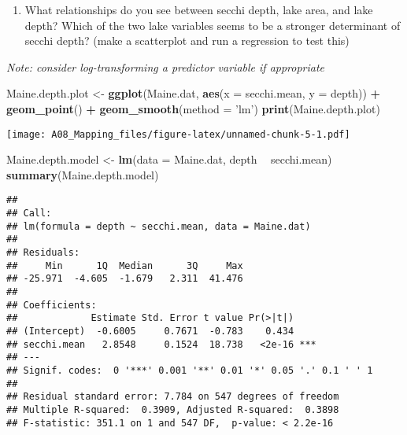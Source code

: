 \documentclass[]{article}
\newenvironment{Shaded}{\begin{snugshade}}{\end{snugshade}}
\newcommand{\DataTypeTok}[1]{\textcolor[rgb]{0.13,0.29,0.53}{#1}}
\newcommand{\KeywordTok}[1]{\textcolor[rgb]{0.13,0.29,0.53}{\textbf{#1}}}
\newcommand{\NormalTok}[1]{#1}
\newcommand{\OperatorTok}[1]{\textcolor[rgb]{0.81,0.36,0.00}{\textbf{#1}}}
\newcommand{\StringTok}[1]{\textcolor[rgb]{0.31,0.60,0.02}{#1}}
\providecommand{\tightlist}{%
  \setlength{\itemsep}{0pt}\setlength{\parskip}{0pt}}
\begin{document}
\begin{enumerate}
\def\labelenumi{\arabic{enumi}.}
\setcounter{enumi}{8}
\tightlist
\item
  What relationships do you see between secchi depth, lake area, and
  lake depth? Which of the two lake variables seems to be a stronger
  determinant of secchi depth? (make a scatterplot and run a regression
  to test this)
\end{enumerate}

\emph{Note: consider log-transforming a predictor variable if
appropriate}

\begin{Shaded}
\begin{Highlighting}[]
\NormalTok{Maine.depth.plot <-}\StringTok{ }\KeywordTok{ggplot}\NormalTok{(Maine.dat, }\KeywordTok{aes}\NormalTok{(}\DataTypeTok{x =}\NormalTok{ secchi.mean, }\DataTypeTok{y =}\NormalTok{ depth)) }\OperatorTok{+}
\StringTok{  }\KeywordTok{geom_point}\NormalTok{() }\OperatorTok{+}
\StringTok{  }\KeywordTok{geom_smooth}\NormalTok{(}\DataTypeTok{method =} \StringTok{'lm'}\NormalTok{)}
\KeywordTok{print}\NormalTok{(Maine.depth.plot)}
\end{Highlighting}
\end{Shaded}

\texttt{[image: A08\_Mapping\_files/figure-latex/unnamed-chunk-5-1.pdf]}

\begin{Shaded}
\begin{Highlighting}[]
\NormalTok{Maine.depth.model <-}\StringTok{ }\KeywordTok{lm}\NormalTok{(}\DataTypeTok{data =}\NormalTok{ Maine.dat, depth }\OperatorTok{~}\StringTok{ }\NormalTok{secchi.mean)}
\KeywordTok{summary}\NormalTok{(Maine.depth.model)}
\end{Highlighting}
\end{Shaded}

\begin{verbatim}
## 
## Call:
## lm(formula = depth ~ secchi.mean, data = Maine.dat)
## 
## Residuals:
##     Min      1Q  Median      3Q     Max 
## -25.971  -4.605  -1.679   2.311  41.476 
## 
## Coefficients:
##             Estimate Std. Error t value Pr(>|t|)    
## (Intercept)  -0.6005     0.7671  -0.783    0.434    
## secchi.mean   2.8548     0.1524  18.738   <2e-16 ***
## ---
## Signif. codes:  0 '***' 0.001 '**' 0.01 '*' 0.05 '.' 0.1 ' ' 1
## 
## Residual standard error: 7.784 on 547 degrees of freedom
## Multiple R-squared:  0.3909, Adjusted R-squared:  0.3898 
## F-statistic: 351.1 on 1 and 547 DF,  p-value: < 2.2e-16
\end{verbatim}
\end{document}
